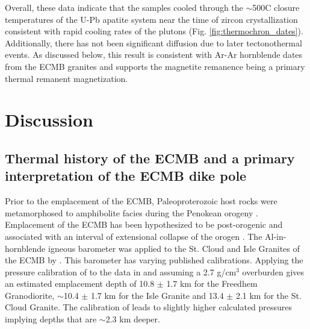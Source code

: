 \documentclass[draft]{agujournal2019}
\begin{document}
Overall, these data indicate that the samples cooled through the $\sim$500\textdegree C closure temperatures of the U-Pb apatite system near the time of zircon crystallization consistent with rapid cooling rates of the plutons (Fig. \ref{fig:thermochron_dates}). Additionally, there has not been significant diffusion due to later tectonothermal events. As discussed below, this result is consistent with Ar-Ar hornblende dates from the ECMB granites and supports the magnetite remanence being a primary thermal remanent magnetization.

\section{Discussion}

\subsection{Thermal history of the ECMB and a primary interpretation of the ECMB dike pole}

Prior to the emplacement of the ECMB, Paleoproterozoic host rocks were metamorphosed to amphibolite facies during the Penokean orogeny \cite{Holm1990a}. Emplacement of the ECMB has been hypothesized to be post-orogenic and associated with an interval of extensional collapse of the orogen \cite{Holm1996a, Boerboom2000a}. The Al-in-hornblende igneous barometer was applied to the St. Cloud and Isle Granites of the ECMB by . This barometer has varying published calibrations. Applying the pressure calibration of  to the data in  and assuming a 2.7 g/cm$^{3}$ overburden gives an estimated emplacement depth of 10.8 $\pm$ 1.7 km for the Freedhem Granodiorite, $\sim$10.4 $\pm$ 1.7 km for the Isle Granite and 13.4 $\pm$ 2.1 km for the St. Cloud Granite. The calibration of  leads to slightly higher calculated pressures implying depths that are $\sim$2.3 km deeper. 
\end{document}
